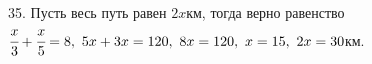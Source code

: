 35. Пусть весь путь равен $2x$км, тогда верно равенство $\cfrac{x}{3}+\cfrac{x}{5}=8,\ 5x+3x=120,\ 8x=120,\ x=15,\ 2x=30$км.\\
